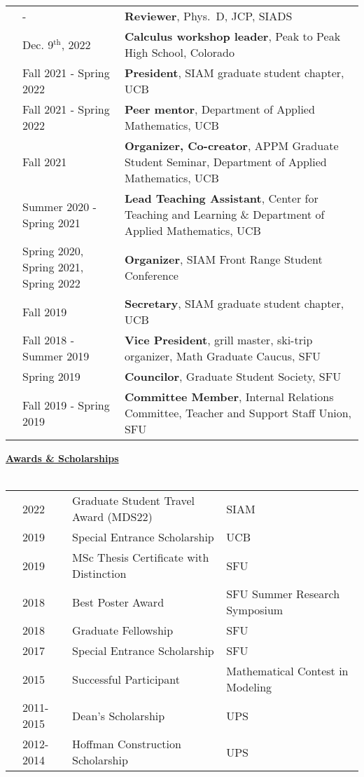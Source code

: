 \documentclass[letterpaper,11pt,oneside]{article}
\newcommand{\headr}[1]{\vspace{10pt}\uline{\Large{\textbf{#1}} \hfill } \\ \vspace{-10pt}\\}
\begin{document}
\begin{tabular}{@{} p{0.01cm} p{4.5cm} p{12cm}}
& - & {\bf Reviewer}, Phys.\ D, JCP, SIADS\\
& Dec. 9$^\text{th}$, 2022 & {\bf Calculus workshop leader}, Peak to Peak High School, Colorado \\ 
& Fall 2021 - Spring 2022 & \textbf{President}, SIAM graduate student chapter, UCB\\
& Fall 2021 - Spring 2022  & \textbf{Peer mentor}, Department of Applied Mathematics, UCB\\
& Fall 2021  & \textbf{Organizer, Co-creator}, APPM Graduate Student Seminar, Department of Applied Mathematics, UCB\\
& Summer 2020 - Spring 2021 & \textbf{Lead Teaching Assistant}, Center for Teaching and Learning \& Department of Applied Mathematics, UCB\\
& Spring 2020, Spring 2021, Spring 2022  & \textbf{Organizer}, SIAM Front Range Student Conference \\
& Fall 2019  & \textbf{Secretary}, SIAM graduate student chapter, UCB\\
& Fall 2018 - Summer 2019 & \textbf{Vice President}, grill master, ski-trip organizer, Math Graduate Caucus, SFU\\
& Spring 2019 & \textbf{Councilor}, Graduate Student Society, SFU\\
& Fall 2019 - Spring 2019 & \textbf{Committee Member}, Internal Relations Committee, Teacher and Support Staff Union, SFU \\
\end{tabular}

\headr{Awards \& Scholarships}

\begin{tabular}{@{} p{0.01cm} p{2cm} p{9cm} p{8cm}}
& 2022 & Graduate Student Travel Award (MDS22) & SIAM \\
& 2019 & Special Entrance Scholarship & UCB \\
& 2019 & MSc Thesis Certificate with Distinction & SFU \\
& 2018 & Best Poster Award & SFU Summer Research Symposium \\
& 2018 & Graduate Fellowship & SFU \\
& 2017 & Special Entrance Scholarship & SFU \\
& 2015 & Successful Participant & Mathematical Contest in Modeling \\
& 2011-2015 & Dean’s Scholarship & UPS\\
& 2012-2014 & Hoffman Construction Scholarship & UPS\\ 
\end{tabular}
\end{document}
